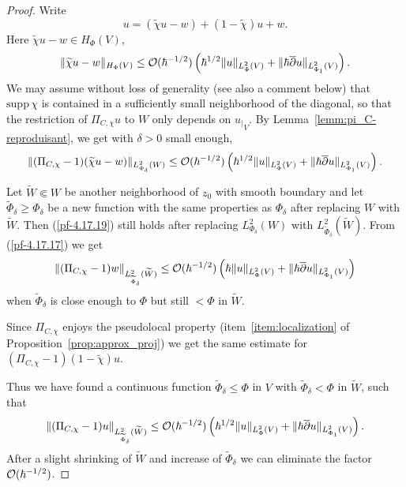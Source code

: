 \documentclass{article}
\newcommand{\h}{\hbar}
\begin{document}
\begin{proof}
  \par Write
  \begin{equation}\label{pf-4.17.18}
    u=(\widetilde{\chi }u-w)+(1-\widetilde{\chi })u+w.
  \end{equation}
  Here $\widetilde{\chi }u-w\in H_\Phi (V)$,
  \[
  \| \widetilde{\chi }u-w\|_{H_\Phi (V)}\le {\cal O}(\h ^{-1/2})\left(
    \h ^{1/2}\| u\|_{L^2_\Phi (V)}+\| \h \overline{\partial }u
    \|_{L^2_{\Phi _1}(V)} \right) .
  \]
  We may assume without loss of generality (see also a comment below)
  that $\mathrm{supp\,}\chi $ is contained in a sufficiently small
  neighborhood of the diagonal, so that the restriction of
  $\Pi _{C,\chi }u$ to $W$ only depends on ${{u}_\vert}_{V}$. By
  Lemma~\ref{lemm:pi_C-reproduisant}, we get with $\delta >0$ small
  enough,
  \begin{equation}\label{pf-4.17.19}
    \| (\Pi _{C,\chi }-1)(\widetilde{\chi }u-w)\|_{L^2_{\Phi
        _\delta     }(W)}
    \le {\cal O}(\h ^{-1/2})\left( \h ^{1/2}\|
      u\|_{L^2_\Phi (V)}+\| \h \overline{\partial }u \|_{L^2_{\Phi _1}(V)}
    \right) .
  \end{equation}

  Let $\widetilde{W}\Subset W$ be another neighborhood of $z_0$ with
  smooth boundary and let $\widetilde{\Phi }_\delta \ge \Phi _\delta $
  be a new function with the same properties as $\Phi _\delta $ after
  replacing $W$ with $\widetilde{W}$. Then (\ref{pf-4.17.19}) still
  holds after replacing $L^2_{\Phi _\delta }(W)$ with
  $L^2_{\widetilde{\Phi } _\delta }(\widetilde{W})$. From
  (\ref{pf-4.17.17}) we get
  \begin{equation}\label{pf-4.17.20}
    \| (\Pi _{C,\chi }-1)w\|_{L^2_{\widetilde{\Phi }_\delta
      }(\widetilde{W})}\le {\cal O}(\h ^{-1/2})\left( \h \|
      u\|_{L^2_\Phi (V)}+\| \h \overline{\partial }u \|_{L^2_{\Phi _1}(V)}
    \right) 
  \end{equation}
  when $\widetilde{\Phi }_\delta $ is close enough to $\Phi $ but
  still $<\Phi $ in $\widetilde{W}$.

  Since $\Pi _{C,\chi }$ enjoys the pseudolocal property
  (item~\ref{item:localization} of Proposition~\ref{prop:approx_proj})
  we get the same estimate for
  $(\Pi _{C,\chi }-1)(1-\widetilde{\chi })u$.

  \par Thus we have found a continuous function
  $\widetilde{\Phi }_\delta \le \Phi $ in $V$ with
  $\widetilde{\Phi }_\delta <\Phi $ in $\widetilde{W}$, such that
  \begin{equation}\label{pf-4.17.21}
    \| (\Pi _{C,\chi }-1)u\|_{L^2_{\widetilde{\Phi }_\delta
      }(\widetilde{W})}\le {\cal O}(\h ^{-1/2})\left( \h ^{1/2}\|
      u\|_{L^2_\Phi (V)}+\| \h \overline{\partial }u \|_{L^2_{\Phi _1}(V)}
    \right) .
  \end{equation}
  After a slight shrinking of $\widetilde{W}$ and increase of
  $\widetilde{\Phi }_\delta $ we can eliminate the factor
  ${\cal O}(\h ^{-1/2})$.


\end{proof}
\end{document}
